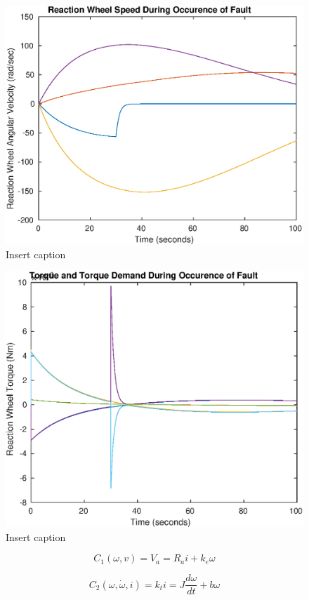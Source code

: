 \begin{figure}
	\centering
	\includegraphics[width=120mm]{figures/residOmega}
	\caption{Insert caption}
	\label{fig:residualOmega}
\end{figure} 

\begin{figure}
	\centering
	\includegraphics[width=120mm]{figures/residTau}
	\caption{Insert caption}
	\label{fig:residualTau}
\end{figure} 

\begin{equation}
C_1(\omega, v) = V_a = R_a i + k_e \omega
\end{equation}

\begin{equation}
C_2(\omega, \dot{\omega}, i) =  k_{t}i  =J\dfrac{d\omega}{dt} + b\omega
\end{equation}

